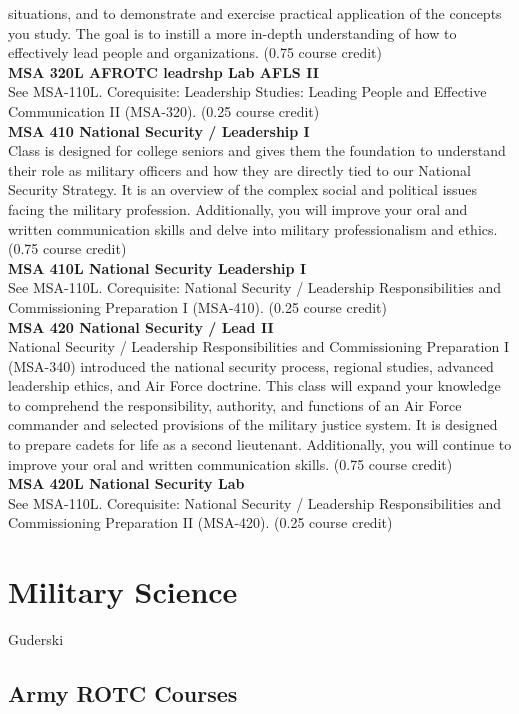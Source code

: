 \documentclass[
  letterpaper,
]{scrbook}
\begin{document}
situations, and to demonstrate and exercise practical application of the
concepts you study. The goal is to instill a more in-depth understanding
of how to effectively lead people and organizations. (0.75 course
credit)\\
\textbf{MSA 320L AFROTC leadrshp Lab AFLS II}\\
See MSA-110L. Corequisite: Leadership Studies: Leading People and
Effective Communication II (MSA-320). (0.25 course credit)\\
\textbf{MSA 410 National Security / Leadership I}\\
Class is designed for college seniors and gives them the foundation to
understand their role as military officers and how they are directly
tied to our National Security Strategy. It is an overview of the complex
social and political issues facing the military profession.
Additionally, you will improve your oral and written communication
skills and delve into military professionalism and ethics. (0.75 course
credit)\\
\textbf{MSA 410L National Security Leadership I}\\
See MSA-110L. Corequisite: National Security / Leadership
Responsibilities and Commissioning Preparation I (MSA-410). (0.25 course
credit)\\
\textbf{MSA 420 National Security / Lead II}\\
National Security / Leadership Responsibilities and Commissioning
Preparation I (MSA-340) introduced the national security process,
regional studies, advanced leadership ethics, and Air Force doctrine.
This class will expand your knowledge to comprehend the responsibility,
authority, and functions of an Air Force commander and selected
provisions of the military justice system. It is designed to prepare
cadets for life as a second lieutenant. Additionally, you will continue
to improve your oral and written communication skills. (0.75 course
credit)\\
\textbf{MSA 420L National Security Lab}\\
See MSA-110L. Corequisite: National Security / Leadership
Responsibilities and Commissioning Preparation II (MSA-420). (0.25
course credit)

\section{Military Science}\label{military-science}

Guderski

\subsection{Army ROTC Courses}\label{army-rotc-courses}
\end{document}
